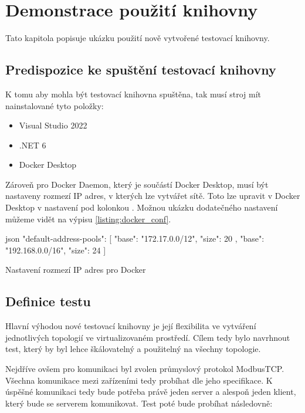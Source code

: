 \chapter{Demonstrace použití knihovny}\label{chap:demonstration}

Tato kapitola popisuje ukázku použití nově vytvořené testovací knihovny.


\section{Predispozice ke spuštění testovací knihovny}\label{sec:test_requirements}

K tomu aby mohla být testovací knihovna spuštěna, tak musí stroj mít nainstalované tyto položky:

\begin{itemize}
    \item Visual Studio 2022
    \item .NET 6
    \item Docker Desktop
\end{itemize}

Zároveň pro Docker Daemon, který je součástí Docker Desktop, musí být nastaveny rozmezí IP adres, v kterých lze vytvářet sítě. Toto lze upravit v Docker Desktop v nastavení pod kolonkou . Možnou ukázku dodatečného nastavení můžeme vidět na výpisu \ref{listing:docker_conf}. 

\begin{listing}[htbp]
    \centering
    \begin{cminted}{json}
"default-address-pools": [
    {
      "base": "172.17.0.0/12",
      "size": 20
    },
    {
      "base": "192.168.0.0/16",
      "size": 24
    }
]
    \end{cminted}
\caption{Nastavení rozmezí IP adres pro Docker}
\label{listing:docker_conf}
\end{listing}


\section{Definice testu}\label{sec:modbus_test}

Hlavní výhodou nové testovací knihovny je její flexibilita ve vytváření jednotlivých topologií ve virtualizovaném prostředí. Cílem tedy bylo navrhnout test, který by byl lehce škálovatelný a použitelný na všechny topologie. 

Nejdříve ovšem pro komunikaci byl zvolen průmyslový protokol ModbusTCP. Všechna komunikace mezi zařízeními tedy probíhat dle jeho specifikace. K úspěšné komunikaci tedy bude potřeba právě jeden server a alespoň jeden klient, který bude se serverem komunikovat. Test poté bude probíhat následovně:

